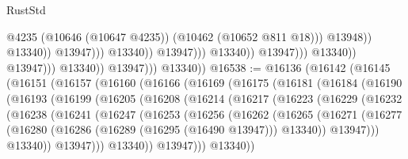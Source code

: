 \begin{lexlean}{RustStd}
\begin{coremodule}
                                                                @4235
                                                                (@10646 (@10647 @4235))
                                                                (@10462 (@10652 @811 @18)))
                                                              @13948))
                                                          @13340))
                                                      @13947)))
                                                @13340))
                                            @13947)))
                                      @13340))
                                  @13947)))
                            @13340))
                        @13947)))
                  @13340))
              @13947)))
        @13340))
@16538 := @16136
    (@16142
      (@16145
        (@16151
          (@16157
            (@16160
              (@16166
                (@16169
                  (@16175
                    (@16181
                      (@16184
                        (@16190
                          (@16193
                            (@16199
                              (@16205
                                (@16208
                                  (@16214
                                    (@16217
                                      (@16223
                                        (@16229
                                          (@16232
                                            (@16238
                                              (@16241
                                                (@16247
                                                  (@16253
                                                    (@16256
                                                      (@16262
                                                        (@16265
                                                          (@16271
                                                            (@16277
                                                              (@16280
                                                                (@16286
                                                                  (@16289 (@16295 (@16490 @13947)))
                                                                  @13340))
                                                              @13947)))
                                                        @13340))
                                                    @13947)))
                                              @13340))
                                          @13947)))
                                    @13340))

\end{coremodule}
\end{lexlean}
